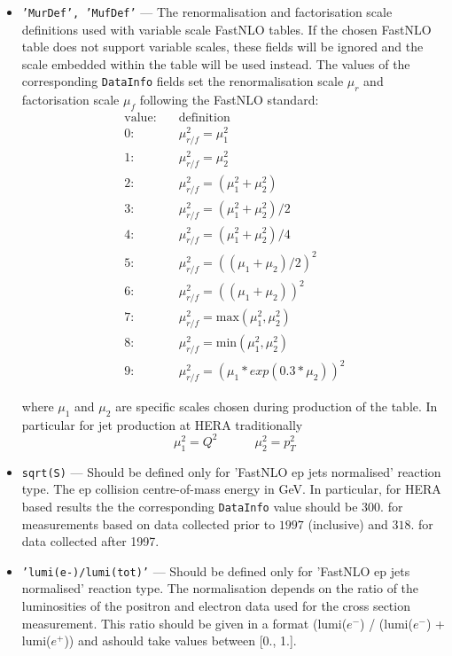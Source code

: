 \begin{description}
\begin{itemize}
    \item {\tt 'MurDef', 'MufDef'} --- The renormalisation and factorisation scale definitions
    used with variable scale FastNLO tables. If the chosen FastNLO table does not support 
    variable scales, these fields will be ignored and the scale embedded within the table will 
    be used instead. The values of the corresponding {\tt DataInfo} fields set 
    the renormalisation scale $\mu_r$ and factorisation scale $\mu_f$ following the FastNLO standard:
    \begin{align*} 
       \text{value} :&\quad \text{definition} \\
       0 :&\quad   \mu_{r/f}^2 = \mu_1^2 \\
       1 :&\quad   \mu_{r/f}^2 = \mu_2^2 \\
       2 :&\quad   \mu_{r/f}^2 = ( \mu_1^2 + \mu_2^2 )\\
       3 :&\quad   \mu_{r/f}^2 = ( \mu_1^2 + \mu_2^2 ) / 2 \\
       4 :&\quad   \mu_{r/f}^2 = ( \mu_1^2 + \mu_2^2 ) / 4 \\
       5 :&\quad   \mu_{r/f}^2 = (( \mu_1 + \mu_2 ) / 2 )^2\\
       6 :&\quad   \mu_{r/f}^2 = (( \mu_1 + \mu_2 ))^2\\
       7 :&\quad   \mu_{r/f}^2 = \text{max}( \mu_1^2, \mu_2^2)\\
       8 :&\quad   \mu_{r/f}^2 = \text{min}( \mu_1^2, \mu_2^2) \\
       9 :&\quad   \mu_{r/f}^2 = (\mu_1 * exp(0.3 * \mu_2)) ^2
   \end{align*}

   where $\mu_1$ and $\mu_2$ are specific scales chosen during production of the table. In particular
   for jet production at HERA traditionally 
   \begin{equation*}
          \mu_1^2 = Q^2 \quad \quad \quad \mu_2^2 = p_T^2
    \end{equation*}  

   \item {\tt sqrt(S)} --- Should be defined only for 'FastNLO ep jets normalised' reaction type. 
         The ep collision centre-of-mass energy in GeV. In particular, for 
         HERA based results the the corresponding {\tt DataInfo} value should be $300.$ for measurements
         based on data collected prior to $1997$ (inclusive) and $318.$ for data collected after 1997.

   \item {\tt 'lumi(e-)/lumi(tot)'} --- Should be defined only for 'FastNLO ep jets normalised'
         reaction type. The normalisation depends on the ratio of the luminosities of the positron and electron data 
         used for the cross section measurement. This ratio should  be
         given in a format (lumi($e^-$) / (lumi($e^-$) + lumi($e^+$)) and ashould take values between [0., 1.].


\end{itemize}
\end{description}
